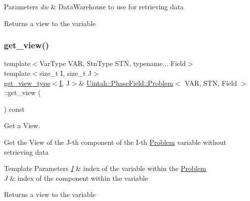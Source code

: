 \begin{DoxyParams}{Parameters}
{\em dw} & Data\+Warehouse to use for retrieving data \\
\hline
\end{DoxyParams}
\begin{DoxyReturn}{Returns}
a view to the variable 
\end{DoxyReturn}
\mbox{\label{classUintah_1_1PhaseField_1_1Problem_aaca1687245d8afb5c1a86e076cf332fb}} 
\subsubsection{\texorpdfstring{get\+\_\+view()}{get\_view()}\hspace{0.1cm}{\footnotesize\ttfamily [3/4]}}
{\footnotesize\ttfamily template$<$Var\+Type V\+AR, Stn\+Type S\+TN, typename... Field$>$ \\
template$<$size\+\_\+t I, size\+\_\+t J$>$ \\
\hyperlink{classUintah_1_1PhaseField_1_1Problem_a53d941e785f501dddb8c369644eae4fa}{get\+\_\+view\+\_\+type}$<$\hyperlink{structUintah_1_1PhaseField_1_1I}{I}, J$>$\& \hyperlink{classUintah_1_1PhaseField_1_1Problem}{Uintah\+::\+Phase\+Field\+::\+Problem}$<$ V\+AR, S\+TN, Field $>$\+::get\+\_\+view (\begin{DoxyParamCaption}{ }\end{DoxyParamCaption}) const\hspace{0.3cm}{\ttfamily [inline]}}



Get a View. 

Get the View of the J-\/th component of the I-\/th \hyperlink{classUintah_1_1PhaseField_1_1Problem}{Problem} variable without retrieving data


\begin{DoxyTemplParams}{Template Parameters}
{\em \hyperlink{structUintah_1_1PhaseField_1_1I}{I}} & index of the variable within the \hyperlink{classUintah_1_1PhaseField_1_1Problem}{Problem} \\
\hline
{\em J} & index of the component within the variable \\
\hline
\end{DoxyTemplParams}
\begin{DoxyReturn}{Returns}
a view to the variable 
\end{DoxyReturn}
\mbox{\label{classUintah_1_1PhaseField_1_1Problem_aeff947e34ce8b615a988f77af9eac55c}} 
